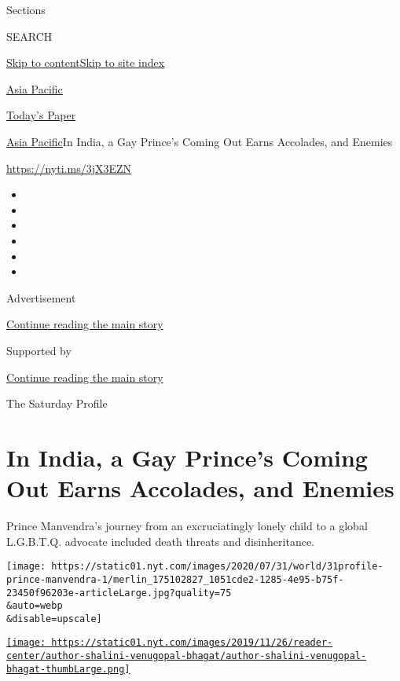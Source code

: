 Sections

SEARCH

\protect\hyperlink{site-content}{Skip to
content}\protect\hyperlink{site-index}{Skip to site index}

\href{https://www.nytimes.com/section/world/asia}{Asia Pacific}

\href{https://myaccount.nytimes.com/auth/login?response_type=cookie\&client_id=vi}{}

\href{https://www.nytimes.com/section/todayspaper}{Today's Paper}

\href{/section/world/asia}{Asia Pacific}\textbar{}In India, a Gay
Prince's Coming Out Earns Accolades, and Enemies

\url{https://nyti.ms/3jX3EZN}

\begin{itemize}
\item
\item
\item
\item
\item
\item
\end{itemize}

Advertisement

\protect\hyperlink{after-top}{Continue reading the main story}

Supported by

\protect\hyperlink{after-sponsor}{Continue reading the main story}

The Saturday Profile

\hypertarget{in-india-a-gay-princes-coming-out-earns-accolades-and-enemies}{%
\section{In India, a Gay Prince's Coming Out Earns Accolades, and
Enemies}\label{in-india-a-gay-princes-coming-out-earns-accolades-and-enemies}}

Prince Manvendra's journey from an excruciatingly lonely child to a
global L.G.B.T.Q. advocate included death threats and disinheritance.

\texttt{[image: https://static01.nyt.com/images/2020/07/31/world/31profile-prince-manvendra-1/merlin\_175102827\_1051cde2-1285-4e95-b75f-23450f96203e-articleLarge.jpg?quality=75\\\&auto=webp\\\&disable=upscale]}

\href{https://www.nytimes.com/by/shalini-venugopal-bhagat}{\texttt{[image: https://static01.nyt.com/images/2019/11/26/reader-center/author-shalini-venugopal-bhagat/author-shalini-venugopal-bhagat-thumbLarge.png]}}

